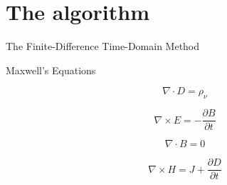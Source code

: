 \section{The algorithm}

The Finite-Difference Time-Domain Method

Maxwell's Equations

\begin{displaymath}
  \nabla \cdot D = \rho_{\nu}
\end{displaymath}


\begin{displaymath}
    \nabla \times E = -\frac{\partial B}{\partial t}
\end{displaymath}


\begin{displaymath}
  \nabla \cdot B = 0
\end{displaymath}


\begin{displaymath}
  \nabla \times H = J + \frac{\partial D}{\partial t}
\end{displaymath}
